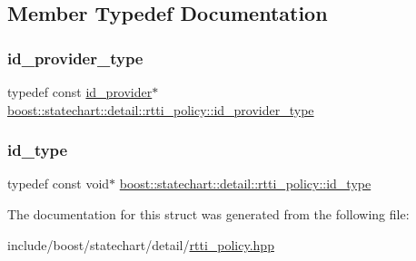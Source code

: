 \subsection{Member Typedef Documentation}
\mbox{\label{structboost_1_1statechart_1_1detail_1_1rtti__policy_afd9bc153e4b739bd085ea646f21c3cba}} 
\subsubsection{\texorpdfstring{id\+\_\+provider\+\_\+type}{id\_provider\_type}}
{\footnotesize\ttfamily typedef const \mbox{\hyperlink{structboost_1_1statechart_1_1detail_1_1id__provider}{id\+\_\+provider}}$\ast$ \mbox{\hyperlink{structboost_1_1statechart_1_1detail_1_1rtti__policy_afd9bc153e4b739bd085ea646f21c3cba}{boost\+::statechart\+::detail\+::rtti\+\_\+policy\+::id\+\_\+provider\+\_\+type}}}

\mbox{\label{structboost_1_1statechart_1_1detail_1_1rtti__policy_a57d56a3531686fb2b92d733b5da620c2}} 
\subsubsection{\texorpdfstring{id\+\_\+type}{id\_type}}
{\footnotesize\ttfamily typedef const void$\ast$ \mbox{\hyperlink{structboost_1_1statechart_1_1detail_1_1rtti__policy_a57d56a3531686fb2b92d733b5da620c2}{boost\+::statechart\+::detail\+::rtti\+\_\+policy\+::id\+\_\+type}}}



The documentation for this struct was generated from the following file\+:\begin{DoxyCompactItemize}
\item 
include/boost/statechart/detail/\mbox{\hyperlink{rtti__policy_8hpp}{rtti\+\_\+policy.\+hpp}}\end{DoxyCompactItemize}
